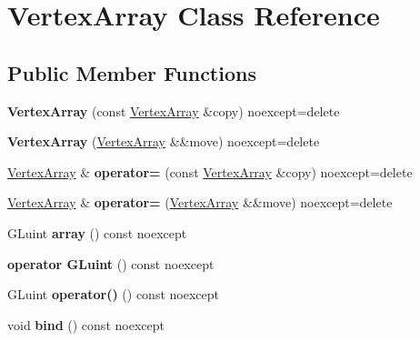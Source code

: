 \hypertarget{class_vertex_array}{}\section{Vertex\+Array Class Reference}
\label{class_vertex_array}
\subsection*{Public Member Functions}
\begin{DoxyCompactItemize}
\item 
\mbox{\label{class_vertex_array_adbe0c6fbbb0642e50ae62289b7100ce2}} 
{\bfseries Vertex\+Array} (const \mbox{\hyperlink{class_vertex_array}{Vertex\+Array}} \&copy) noexcept=delete
\item 
\mbox{\label{class_vertex_array_ad70583c010f05e829d38905fa4b3be9b}} 
{\bfseries Vertex\+Array} (\mbox{\hyperlink{class_vertex_array}{Vertex\+Array}} \&\&move) noexcept=delete
\item 
\mbox{\label{class_vertex_array_a10502286399e75b07990e641d10fd46b}} 
\mbox{\hyperlink{class_vertex_array}{Vertex\+Array}} \& {\bfseries operator=} (const \mbox{\hyperlink{class_vertex_array}{Vertex\+Array}} \&copy) noexcept=delete
\item 
\mbox{\label{class_vertex_array_a2a7dacbd3ecf0c329b6d5aca539f9e4d}} 
\mbox{\hyperlink{class_vertex_array}{Vertex\+Array}} \& {\bfseries operator=} (\mbox{\hyperlink{class_vertex_array}{Vertex\+Array}} \&\&move) noexcept=delete
\item 
\mbox{\label{class_vertex_array_a86ed2bad5ca6da14abcbe375fb85573b}} 
G\+Luint {\bfseries array} () const noexcept
\item 
\mbox{\label{class_vertex_array_ac2f1a65714925fefa168b0bf73e10239}} 
{\bfseries operator G\+Luint} () const noexcept
\item 
\mbox{\label{class_vertex_array_a505dea22527e6203ed1d937ae21caf9f}} 
G\+Luint {\bfseries operator()} () const noexcept
\item 
\mbox{\label{class_vertex_array_ae7ead636d345991673b2577010a4d776}} 
void {\bfseries bind} () const noexcept
\end{DoxyCompactItemize}
